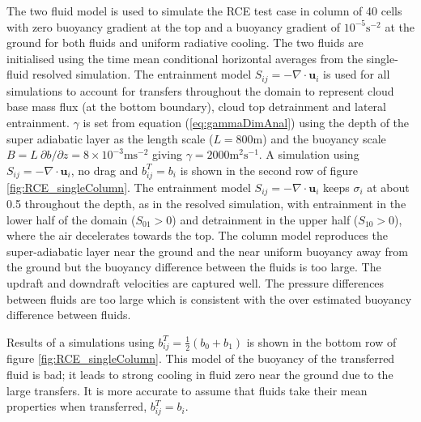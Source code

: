 \documentclass[draft]{agujournal2019}
\begin{document}
The two fluid model is used to simulate the RCE test case in 
column of 40 cells with zero buoyancy gradient at the top and a buoyancy
gradient of $10^{-5}\text{s}^{-2}$ at the ground for both fluids
and uniform radiative cooling. The two fluids are initialised using
the time mean conditional horizontal averages from the single-fluid
resolved simulation. The entrainment model $S_{ij}=-\nabla\cdot\mathbf{u}_{i}$
is used for all simulations to account for transfers throughout the
domain to represent cloud base mass flux (at the bottom boundary),
cloud top detrainment and lateral entrainment. $\gamma$ is set from
equation (\ref{eq:gammaDimAnal}) using the depth of the super adiabatic
layer as the length scale ($L=800\text{m}$) and the buoyancy scale
$B=L\ \partial b/\partial z=8\times10^{-3}\text{m}\text{s}^{-2}$
giving $\gamma=2000\text{m}^{2}\text{s}^{-1}$. A simulation using
$S_{ij}=-\nabla\cdot\mathbf{u}_{i}$, no drag and $b_{ij}^{T}=b_{i}$
is shown in the second row of figure \ref{fig:RCE_singleColumn}.
The entrainment model $S_{ij}=-\nabla\cdot\mathbf{u}_{i}$ keeps $\sigma_{i}$
at about 0.5 throughout the depth, as in the resolved simulation,
with entrainment in the lower half of the domain ($S_{01}>0$) and
detrainment in the upper half ($S_{10}>0$), where the air decelerates
towards the top. The  column model reproduces the super-adiabatic
layer near the ground and the near uniform buoyancy away from the
ground but the buoyancy difference between the fluids is too large.
The updraft and downdraft velocities are captured well. The pressure
differences between fluids are too large which is consistent with
the over estimated buoyancy difference between fluids. 

Results of a simulations using $b_{ij}^{T}=\frac{1}{2}(b_{0}+b_{1})$
is shown in the bottom row of figure \ref{fig:RCE_singleColumn}.
This model of the buoyancy of the transferred fluid is bad; it leads
to strong cooling in fluid zero near the ground due to the large transfers.
It is more accurate to assume that fluids take their mean properties
when transferred, $b_{ij}^{T}=b_{i}$. 
\end{document}
